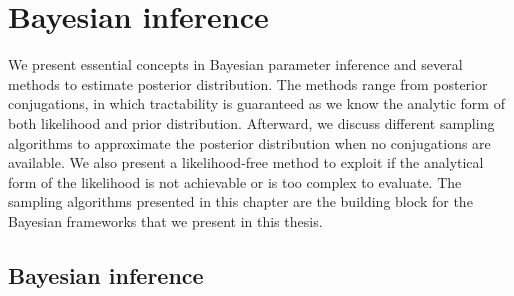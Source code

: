 \chapter{Bayesian inference}
We present essential concepts in Bayesian parameter inference and several methods to estimate
posterior distribution. The methods range from posterior conjugations, in which tractability is
guaranteed as we know the analytic form of both likelihood and prior distribution. Afterward, we
discuss different sampling algorithms to approximate the posterior distribution when no conjugations
are available. We also present a likelihood-free method to exploit if the analytical form of the
likelihood is not achievable or is too complex to evaluate. The sampling algorithms presented in
this chapter are the building block for the Bayesian frameworks that we present in this thesis.

\section{Bayesian inference}
